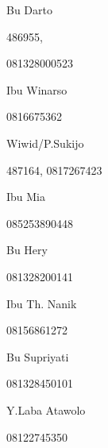 \documentclass{article}
\begin{document}
\begin{figure}
\centering
\begin{minipage}{3.17cm}
Bu Darto

486955, 

081328000523

\end{minipage}
\end{figure}
\begin{figure}
\centering
\begin{minipage}{3.17cm}
Ibu Winarso

0816675362
\end{minipage}
\end{figure}
\begin{figure}
\centering
\begin{minipage}{3.17cm}
Wiwid/P.Sukijo

487164, 0817267423

\end{minipage}
\end{figure}
\begin{figure}
\centering
\begin{minipage}{3.17cm}
Ibu Mia

085253890448
\end{minipage}
\end{figure}
\begin{figure}
\centering
\begin{minipage}{3.069cm}
Bu Hery

081328200141
\end{minipage}
\end{figure}
\begin{figure}
\centering
\begin{minipage}{3.069cm}
Ibu Th. Nanik

08156861272

\end{minipage}
\end{figure}
\begin{figure}
\centering
\begin{minipage}{2.969cm}
Bu Supriyati

081328450101

\end{minipage}
\end{figure}
\begin{figure}
\centering
\begin{minipage}{3.471cm}
Y.Laba Atawolo

08122745350

\end{minipage}
\end{figure}
\end{document}
